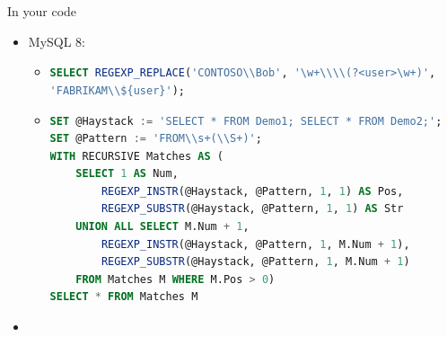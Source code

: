 \documentclass[english,aspectratio=169]{beamer}
\begin{document}
\begin{frame}[fragile]{In your code}
\begin{itemize}
\item MySQL 8:
    \begin{itemize}
    \item \lstinline[language=SQL]!SELECT REGEXP_REPLACE('CONTOSO\\Bob', '\w+\\\\(?<user>\w+)', 'FABRIKAM\\${user}');!
    \item \begin{lstlisting}[language=SQL]
SET @Haystack := 'SELECT * FROM Demo1; SELECT * FROM Demo2;';
SET @Pattern := 'FROM\\s+(\\S+)';
WITH RECURSIVE Matches AS (
    SELECT 1 AS Num,
        REGEXP_INSTR(@Haystack, @Pattern, 1, 1) AS Pos,
        REGEXP_SUBSTR(@Haystack, @Pattern, 1, 1) AS Str
    UNION ALL SELECT M.Num + 1,
        REGEXP_INSTR(@Haystack, @Pattern, 1, M.Num + 1),
        REGEXP_SUBSTR(@Haystack, @Pattern, 1, M.Num + 1)
    FROM Matches M WHERE M.Pos > 0)
SELECT * FROM Matches M
    \end{lstlisting}
    \end{itemize}
\item \textellipsis
\end{itemize}
\end{frame}
\end{document}
